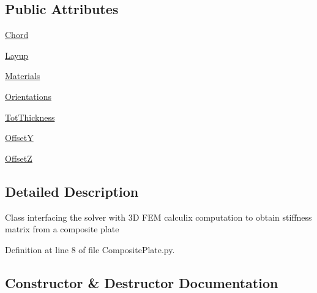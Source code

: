 \subsection*{Public Attributes}
\begin{DoxyCompactItemize}
\item 
\hyperlink{classgebtaero_1_1_composite_plate_1_1_composite_plate_a60ae01b006e99e542c3759058e82e4cb}{Chord}
\item 
\hyperlink{classgebtaero_1_1_composite_plate_1_1_composite_plate_a2e4f4c60f4fa09f7fc9f08e14fce4319}{Layup}
\item 
\hyperlink{classgebtaero_1_1_composite_plate_1_1_composite_plate_a95f58eff2cdd77c45ccdca936c37c12a}{Materials}
\item 
\hyperlink{classgebtaero_1_1_composite_plate_1_1_composite_plate_a4eb3337faccb863b8dc5fe5a9f781dc2}{Orientations}
\item 
\hyperlink{classgebtaero_1_1_composite_plate_1_1_composite_plate_ad0af7183e0e49cba1a3a9ad8e794e311}{Tot\+Thickness}
\item 
\hyperlink{classgebtaero_1_1_composite_plate_1_1_composite_plate_a33de8af0e1aaff88563310459b3b6f6b}{OffsetY}
\item 
\hyperlink{classgebtaero_1_1_composite_plate_1_1_composite_plate_aaf910e794c2f390a539b41a90dd30c83}{OffsetZ}
\end{DoxyCompactItemize}


\subsection{Detailed Description}
\begin{DoxyVerb}Class interfacing the solver with 3D FEM calculix computation to obtain stiffness matrix
from a composite plate
\end{DoxyVerb}
 

Definition at line 8 of file Composite\+Plate.\+py.



\subsection{Constructor \& Destructor Documentation}
\mbox{\label{classgebtaero_1_1_composite_plate_1_1_composite_plate_a067ac11419d1959770398cce5de0a561}} 
